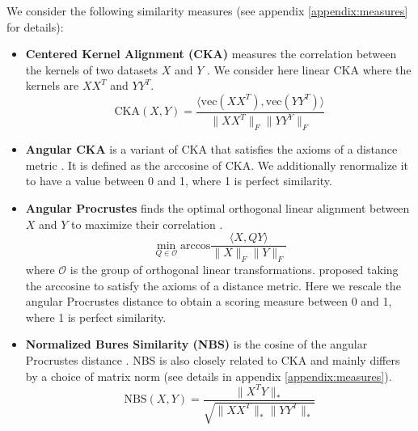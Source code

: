 \documentclass{article} %
\begin{document}
We consider the following similarity measures (see appendix \ref{appendix:measures} for details):
\begin{itemize}
    \item \textbf{Centered Kernel Alignment (CKA)} measures the correlation between the kernels of two datasets $X$ and $Y$ \citep{Kornblith2019}. We consider here linear CKA where the kernels are $XX^T$ and $YY^T$.
    $$\text{CKA}(X, Y) = \dfrac{\langle \text{vec}(XX^T), \text{vec}(YY^T) \rangle}{\|XX^T\|_F \| YY^Y\|_F}$$

    \item \textbf{Angular CKA} is a variant of CKA that satisfies the axioms of a distance metric \citep{Williams2021, lange2022neural}. It is defined as the arccosine of CKA. We additionally renormalize it to have a value between 0 and 1, where 1 is perfect similarity.
    
    \item \textbf{Angular Procrustes} finds the optimal orthogonal linear alignment between $X$ and $Y$ to maximize their correlation \citep{Williams2021, ding2021grounding}.
    $$\min_{Q \in \mathcal{O}} \text{arccos} \dfrac{\langle X, QY\rangle}{\|X\|_F \|Y\|_F}$$
    where $\mathcal{O}$ is the group of orthogonal linear transformations. \citet{Williams2021} proposed taking the arccosine to satisfy the axioms of a distance metric. Here we rescale the angular Procrustes distance to obtain a scoring measure between 0 and 1, where 1 is perfect similarity.

    \item \textbf{Normalized Bures Similarity (NBS)} \citep{tang2020similarity} is the cosine of the angular Procrustes distance \citep{harvey2023duality}. NBS is also closely related to CKA and mainly differs by a choice of matrix norm (see details in appendix \ref{appendix:measures}).
    $$\text{NBS}(X, Y) = \dfrac{\|X^T Y\|_*}{\sqrt{\|X X^T\|_* \|Y Y^T\|_*}}$$



\end{itemize}
\end{document}
